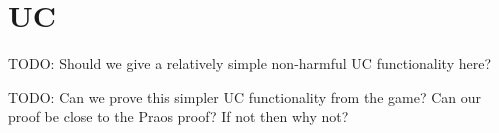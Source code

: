 \section{UC}

TODO:  Should we give a relatively simple non-harmful UC functionality here?

TODO:  Can we prove this simpler UC functionality from the game?  Can our proof be close to the Praos proof?  If not then why not?


















\endinput 



\def\sid{\ensuremath{\mathtt{sid}}}

